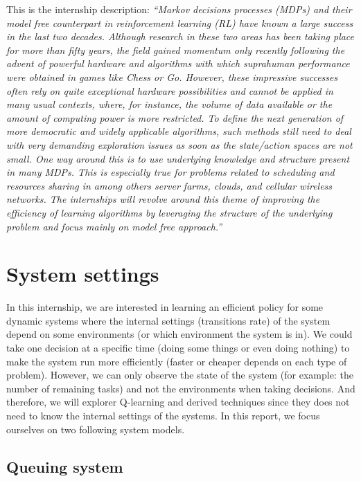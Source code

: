\documentclass[
  a4paper, xcolor = usenames,dvipsnames]{article}
\begin{document}
This is the internship description: \emph{``Markov decisions processes (MDPs) and their model free counterpart in reinforcement learning (RL) have known a large success in the last two decades. Although research in these two areas has been taking place for more than fifty years, the field gained momentum only recently following the advent of powerful hardware and algorithms with which supra­human performance were obtained in games like Chess or Go. However, these impressive successes often rely on quite exceptional hardware possibilities and cannot be applied in many usual contexts, where, for instance, the volume of data available or the amount of computing power is more restricted. To define the next generation of more democratic and widely applicable algorithms, such methods still need to deal with very demanding exploration issues as soon as the state/action spaces are not small. One way around this is to use underlying knowledge and structure present in many MDPs. This is especially true for problems related to scheduling and resources sharing in among others server farms, clouds, and cellular wireless networks. The internships will revolve around this theme of improving the efficiency of learning algorithms by leveraging the structure of the underlying problem and focus mainly on model ­free approach.''}

\hypertarget{system-settings}{%
\section{System settings}\label{system-settings}}

In this internship, we are interested in learning an efficient policy for some dynamic systems where the internal settings (transitions rate) of the system depend on some environments (or which environment the system is in). We could take one decision at a specific time (doing some things or even doing nothing) to make the system run more efficiently (faster or cheaper depends on each type of problem). However, we can only observe the state of the system (for example: the number of remaining tasks) and not the environments when taking decisions. And therefore, we will explorer Q-learning and derived techniques since they does not need to know the internal settings of the systems. In this report, we focus ourselves on two following system models.

\hypertarget{queuing-system}{%
\subsection{Queuing system}\label{queuing-system}}
\end{document}
